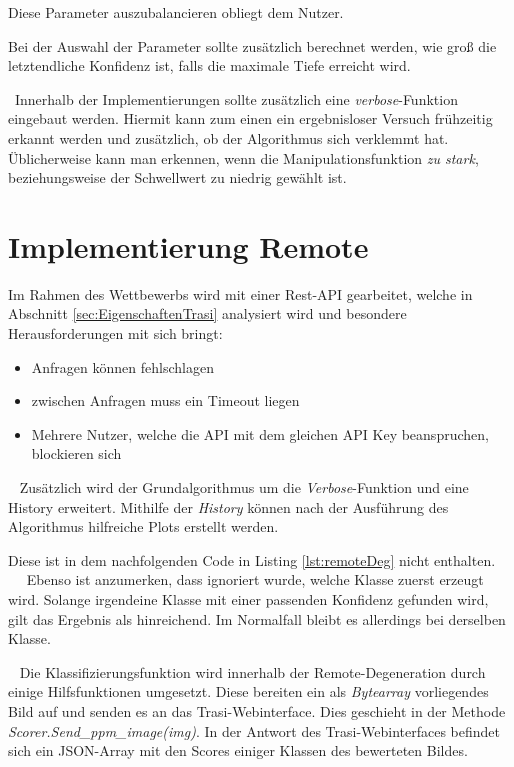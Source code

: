 Diese Parameter auszubalancieren obliegt dem Nutzer. 

Bei der Auswahl der Parameter sollte zusätzlich berechnet werden, wie groß die letztendliche Konfidenz ist, falls die maximale Tiefe erreicht wird. 

~\newline Innerhalb der Implementierungen sollte zusätzlich eine \textit{verbose}-Funktion eingebaut werden. Hiermit kann zum einen ein ergebnisloser Versuch frühzeitig erkannt werden und zusätzlich, ob der Algorithmus sich verklemmt hat. Üblicherweise kann man erkennen, wenn die Manipulationsfunktion \textit{zu stark}, beziehungsweise der Schwellwert zu niedrig gewählt ist.

\newpage
\section{Implementierung Remote}
\label{sec:DegenerationRemote}
Im Rahmen des Wettbewerbs wird mit einer Rest-API gearbeitet, welche in Abschnitt \ref{sec:EigenschaftenTrasi} analysiert wird und besondere Herausforderungen mit sich bringt: 

\begin{itemize}
	\item Anfragen können fehlschlagen
	\item zwischen Anfragen muss ein Timeout liegen
	\item Mehrere Nutzer, welche die API mit dem gleichen API Key beanspruchen, blockieren sich
\end{itemize}
~\newline
Zusätzlich wird der Grundalgorithmus um die \textit{Verbose}-Funktion und eine History erweitert. Mithilfe der \textit{History} können nach der Ausführung des Algorithmus hilfreiche Plots erstellt werden. 

Diese ist in dem nachfolgenden Code in Listing \ref{lst:remoteDeg} nicht enthalten.
~\newline~\newline
Ebenso ist anzumerken, dass ignoriert wurde, welche Klasse zuerst erzeugt wird. Solange irgendeine Klasse mit einer passenden Konfidenz gefunden wird, gilt das Ergebnis als hinreichend. Im Normalfall bleibt es allerdings bei derselben Klasse. 

~\newline 
Die Klassifizierungsfunktion wird innerhalb der Remote-Degeneration durch einige Hilfsfunktionen umgesetzt. Diese bereiten ein als \textit{Bytearray} vorliegendes Bild auf und senden es an das Trasi-Webinterface. Dies geschieht in der Methode \textit{Scorer.Send\_ppm\_image(img)}. In der Antwort des Trasi-Webinterfaces befindet sich ein JSON-Array mit den Scores einiger Klassen des bewerteten Bildes. 


